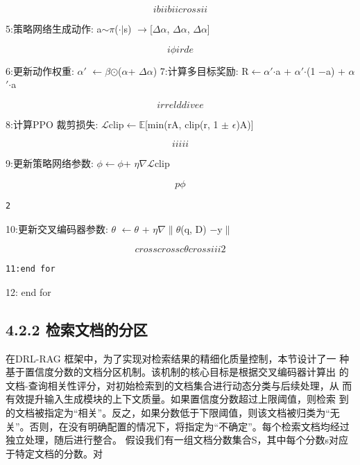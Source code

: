 \documentclass[12pt,a4paper,openright,UTF8]{ctexbook}
\begin{document}
\begin{equation*}
ibiibiicrossii
\end{equation*}

5:策略网络生成动作: a$\sim$$\pi$($\cdot$$|$s) $\rightarrow$[$\Delta$$\alpha$, $\Delta$$\alpha$, $\Delta$$\alpha$]

\begin{equation*}
i\phi irde
\end{equation*}

6:更新动作权重: $\alpha$$'$ $\leftarrow$$\beta$$\odot$($\alpha$+ $\Delta$$\alpha$) 7:计算多目标奖励: R$\leftarrow$$\alpha$$'$$\cdot$a + $\alpha$$'$$\cdot$(1 −a) + $\alpha$$'$$\cdot$a

\begin{equation*}
irrelddivee
\end{equation*}

8:计算PPO 裁剪损失: $\mathcal{L}$clip$\leftarrow$$\mathbb{E}$[min(rA, clip(r, 1 $\pm$ $\epsilon$)A)]

\begin{equation*}
iiiii
\end{equation*}

9:更新策略网络参数: $\phi$$\leftarrow$$\phi$+ $\eta$$\nabla$$\mathcal{L}$clip

\begin{equation*}
p\phi
\end{equation*}

\begin{lstlisting}
2
\end{lstlisting}
10:更新交叉编码器参数: $\theta$ $\leftarrow$$\theta$ + $\eta$$\nabla$$\parallel$$\theta$(q, D) −y$\parallel$

\begin{equation*}
crosscrossc\theta crossiii2
\end{equation*}

\begin{lstlisting}
11:end for
\end{lstlisting}
12: end for

\subsection{4.2.2 检索文档的分区}

在DRL-RAG 框架中，为了实现对检索结果的精细化质量控制，本节设计了一 种基于置信度分数的文档分区机制。该机制的核心目标是根据交叉编码器计算出 的文档-查询相关性评分，对初始检索到的文档集合进行动态分类与后续处理，从 而有效提升输入生成模块的上下文质量。如果置信度分数超过上限阈值，则检索 到的文档被指定为“相关”。反之，如果分数低于下限阈值，则该文档被归类为“无 关”。否则，在没有明确配置的情况下，将指定为“不确定”。每个检索文档均经过 独立处理，随后进行整合。 假设我们有一组文档分数集合S，其中每个分数s对应于特定文档的分数。对
\end{document}
